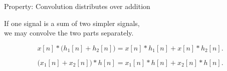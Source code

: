 \documentclass[aspectratio=169,11pt]{beamer}
\newcommand{\CardTitleSize}{\large}
\newcommand{\CardTitle}[1]{%
  \vspace{0.15cm}
  {\CardTitleSize\bfseries #1}\par
}
\begin{document}
\begin{frame}{Property: Convolution distributes over addition}

\begin{BlueBox}[
  calloutshadedblue,
  fontupper=\large,
  halign=center
]{}
If one signal is a sum of two simpler signals, \\ we may convolve the two parts separately.
\end{BlueBox}

\vspace{0.14cm}

\begin{center}
\begin{GreenCard}[
  width=0.88\textwidth,
  halign=center,
  top=12pt,
  bottom=12pt
]


{\Large
\[
x[n]*\big(h_1[n]+h_2[n]\big)
=
x[n]*h_1[n]+x[n]*h_2[n].
\]
}

\vspace{0.08cm}

{\Large
\[
\big(x_1[n]+x_2[n]\big)*h[n]
=
x_1[n]*h[n]+x_2[n]*h[n].
\]
}

\end{GreenCard}
\end{center}



\end{frame}
\end{document}
